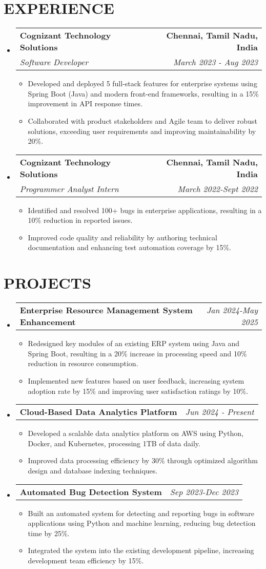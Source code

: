 \documentclass[letterpaper,11pt]{article}
\makeatletter
\newcommand{\resumeItem}[1]{\item\small{{#1 \vspace{-3pt}}}}
\newcommand{\resumeSubheading}[4]{\vspace{-2pt}\item\begin{tabular*}{0.97\textwidth}[t]{l@{\extracolsep{\fill}}r}\textbf{#1} & #2 \\\textit{\small#3} & \textit{\small #4} \\\end{tabular*}\vspace{-7pt}}
\newcommand{\resumeProjectHeading}[2]{\item\begin{tabular*}{0.97\textwidth}{l@{\extracolsep{\fill}}r}\small#1 & #2 \\\end{tabular*}\vspace{-7pt}}
\newcommand{\resumeSubHeadingListStart}{\begin{itemize}[leftmargin=0.15in, label={}]}
\newcommand{\resumeSubHeadingListEnd}{\end{itemize}}
\newcommand{\resumeItemListStart}{\begin{itemize}}
\newcommand{\resumeItemListEnd}{\end{itemize}\vspace{-5pt}}
\makeatother
\begin{document}
\section{{\fontsize{9pt}{20pt}\selectfont \textbf{EXPERIENCE}}}
\resumeSubHeadingListStart
\resumeSubheading{Cognizant Technology Solutions}{\textbf{Chennai, Tamil Nadu, India}}{Software Developer}{March 2023 - Aug 2023}
\resumeItemListStart
\resumeItem{Developed and deployed 5 full-stack features for enterprise systems using Spring Boot (Java) and modern front-end frameworks, resulting in a 15\% improvement in API response times.}
\resumeItem{Collaborated with product stakeholders and Agile team to deliver robust solutions, exceeding user requirements and improving maintainability by 20\%.}
\resumeItemListEnd
\resumeSubheading{Cognizant Technology Solutions}{\textbf{Chennai, Tamil Nadu, India}}{Programmer Analyst Intern}{March 2022-Sept 2022}
\resumeItemListStart
\resumeItem{Identified and resolved 100+ bugs in enterprise applications, resulting in a 10\% reduction in reported issues.}
\resumeItem{Improved code quality and reliability by authoring technical documentation and enhancing test automation coverage by 15\%.}
\resumeItemListEnd
\resumeSubHeadingListEnd
\vspace{-17pt}

\section{{\fontsize{9pt}{20pt}\selectfont \textbf{PROJECTS}}}
\resumeSubHeadingListStart
\resumeProjectHeading{\textbf{Enterprise Resource Management System Enhancement}}{\textit{Jan 2024-May 2025}}
\resumeItemListStart
\resumeItem{Redesigned key modules of an existing ERP system using Java and Spring Boot, resulting in a 20\% increase in processing speed and 10\% reduction in resource consumption.}
\resumeItem{Implemented new features based on user feedback, increasing system adoption rate by 15\% and improving user satisfaction ratings by 10\%.}
\resumeItemListEnd\vspace{-6pt}
\resumeProjectHeading{\textbf{Cloud-Based Data Analytics Platform}}{\textit{Jun 2024 - Present}}
\resumeItemListStart
\resumeItem{Developed a scalable data analytics platform on AWS using Python, Docker, and Kubernetes, processing 1TB of data daily.}
\resumeItem{Improved data processing efficiency by 30\% through optimized algorithm design and database indexing techniques.}
\resumeItemListEnd\vspace{-6pt}
\resumeProjectHeading{\textbf{Automated Bug Detection System}}{\textit{Sep 2023-Dec 2023}}
\resumeItemListStart
\resumeItem{Built an automated system for detecting and reporting bugs in software applications using Python and machine learning, reducing bug detection time by 25\%.}
\resumeItem{Integrated the system into the existing development pipeline, increasing development team efficiency by 15\%.}
\resumeItemListEnd
\resumeSubHeadingListEnd
\vspace{-17pt}
\end{document}

